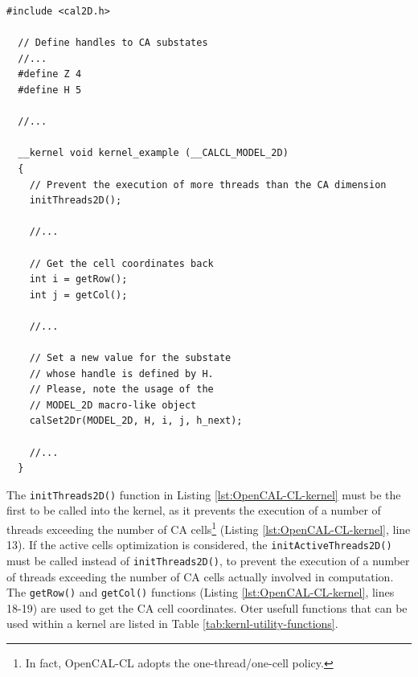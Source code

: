 \begin{lstlisting}[float,floatplacement=H, label=lst:OpenCAL-CL-kernel, caption=Example of OpenCAL-CL kernel.] 
  #include <cal2D.h>

  // Define handles to CA substates
  //...
  #define Z 4
  #define H 5

  //...
  
  __kernel void kernel_example (__CALCL_MODEL_2D)
  {
    // Prevent the execution of more threads than the CA dimension
    initThreads2D();

    //...

    // Get the cell coordinates back
    int i = getRow();
    int j = getCol();

    //...

    // Set a new value for the substate
    // whose handle is defined by H.
    // Please, note the usage of the
    // MODEL_2D macro-like object
    calSet2Dr(MODEL_2D, H, i, j, h_next);
    
    //...
  }
\end{lstlisting}

The \verb'initThreads2D()' function in Listing
\ref{lst:OpenCAL-CL-kernel} must be the first to be called into the
kernel, as it prevents the execution of a number of threads exceeding
the number of CA cells\footnote{In fact, OpenCAL-CL adopts the
  one-thread/one-cell policy.} (Listing \ref{lst:OpenCAL-CL-kernel},
line 13). If the active cells optimization is considered, the
\verb'initActiveThreads2D()' must be called instead of
\verb'initThreads2D()', to prevent the execution of a number of
threads exceeding the number of CA cells actually involved in
computation. The \verb'getRow()' and \verb'getCol()' functions
(Listing \ref{lst:OpenCAL-CL-kernel}, lines 18-19) are used to get the
CA cell coordinates. Oter usefull functions that can be used within a
kernel are listed in Table \ref{tab:kernl-utility-functions}.


